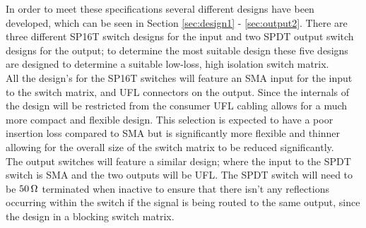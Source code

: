 \documentclass[12pt,openany,a4paper]{book}
\newcommand{\ohm}	{\ensuremath{\rm\,\Omega}}
\begin{document}
In order to meet these specifications several different designs have been developed, which can be seen in Section \ref{sec:design1} - \ref{sec:output2}. There are three different SP16T switch designs for the input and two SPDT output switch designs for the output; to determine the most suitable design these five designs are designed to determine a suitable low-loss, high isolation switch matrix. \\[0.2cm]
All the design's for the SP16T switches will feature an SMA input for the input to the switch matrix, and UFL connectors on the output. Since the internals of the design will be restricted from the consumer UFL cabling allows for a much more compact and flexible design. This selection is expected to have a poor insertion loss compared to SMA but is significantly more flexible and thinner allowing for the overall size of the switch matrix to be reduced significantly.\\
The output switches will feature a similar design; where the input to the SPDT switch is SMA and the two outputs will be UFL. The SPDT switch will need to be $50\ohm$ terminated when inactive to ensure that there isn't any reflections occurring within the switch if the signal is being routed to the same output, since the design in a blocking switch matrix.  
\end{document}
